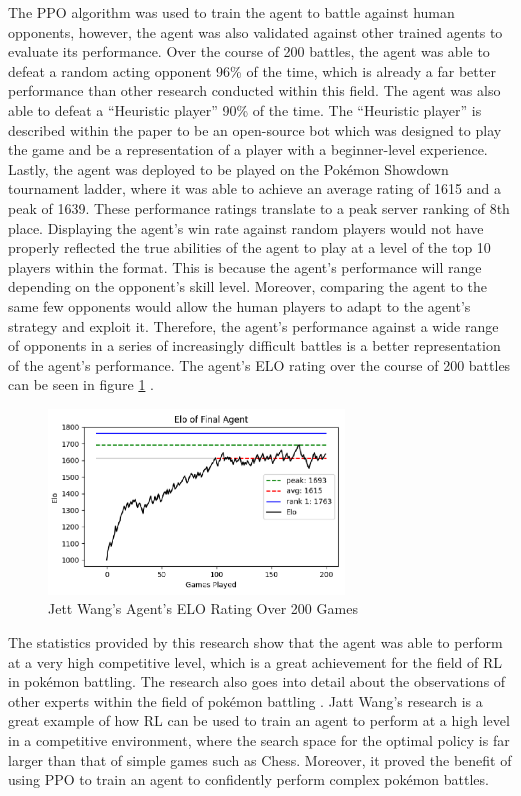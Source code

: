 The PPO algorithm was used to train the agent to battle against human opponents, however, the agent was also validated against other trained agents to evaluate its performance. Over the course of 200 battles, the agent was able to defeat a random acting opponent 96\% of the time, which is already a far better performance than other research conducted within this field. The agent was also able to defeat a ``Heuristic player'' 90\% of the time. The ``Heuristic player'' is described within the paper to be an open-source bot which was designed to play the game and be a representation of a player with a beginner-level experience. Lastly, the agent was deployed to be played on the Pokémon Showdown tournament ladder, where it was able to achieve an average rating of 1615 and a peak of 1639. These performance ratings translate to a peak server ranking of 8th place. Displaying the agent's win rate against random players would not have properly reflected the true abilities of the agent to play at a level of the top 10 players within the format. This is because the agent's performance will range depending on the opponent's skill level. Moreover, comparing the agent to the same few opponents would allow the human players to adapt to the agent's strategy and exploit it. Therefore, the agent's performance against a wide range of opponents in a series of increasingly difficult battles is a better representation of the agent's performance. The agent's ELO rating over the course of 200 battles can be seen in figure \ref{fig:agent_elo} \cite{wang2020winning}.

\begin{figure}[H]
    \centering
    \includegraphics[width=0.7\textwidth]{figures/literature_elo.png}
    \caption{Jett Wang's Agent's ELO Rating Over 200 Games}
    \label{fig:agent_elo}
\end{figure}

The statistics provided by this research show that the agent was able to perform at a very high competitive level, which is a great achievement for the field of RL in pokémon battling. The research also goes into detail about the observations of other experts within the field of pokémon battling \cite{wang2020winning}. Jatt Wang's research is a great example of how RL can be used to train an agent to perform at a high level in a competitive environment, where the search space for the optimal policy is far larger than that of simple games such as Chess. Moreover, it proved the benefit of using PPO to train an agent to confidently perform complex pokémon battles. 

